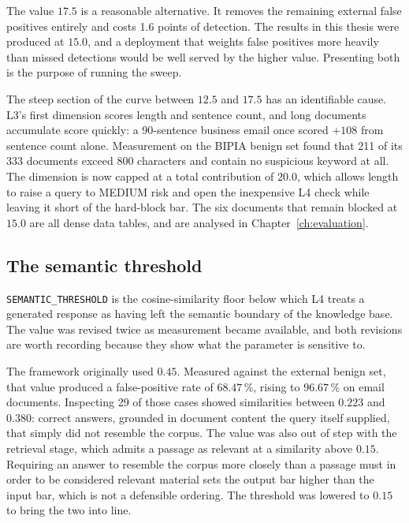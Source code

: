 The value $17.5$ is a reasonable alternative. It removes the remaining external false positives entirely and costs 1.6 points of detection. The results in this thesis were produced at $15.0$, and a deployment that weights false positives more heavily than missed detections would be well served by the higher value. Presenting both is the purpose of running the sweep.

The steep section of the curve between $12.5$ and $17.5$ has an identifiable cause. L3's first dimension scores length and sentence count, and long documents accumulate score quickly: a 90-sentence business email once scored $+108$ from sentence count alone. Measurement on the BIPIA benign set found that 211 of its 333 documents exceed 800 characters and contain no suspicious keyword at all. The dimension is now capped at a total contribution of $20.0$, which allows length to raise a query to MEDIUM risk and open the inexpensive L4 check while leaving it short of the hard-block bar. The six documents that remain blocked at $15.0$ are all dense data tables, and are analysed in Chapter~\ref{ch:evaluation}.

\subsection{The semantic threshold}
\label{subsec:l4_threshold}

\texttt{SEMANTIC\_THRESHOLD} is the cosine-similarity floor below which L4 treats a generated response as having left the semantic boundary of the knowledge base. The value was revised twice as measurement became available, and both revisions are worth recording because they show what the parameter is sensitive to.

The framework originally used $0.45$. Measured against the external benign set, that value produced a false-positive rate of $68.47\,\%$, rising to $96.67\,\%$ on email documents. Inspecting 29 of those cases showed similarities between $0.223$ and $0.380$: correct answers, grounded in document content the query itself supplied, that simply did not resemble the corpus. The value was also out of step with the retrieval stage, which admits a passage as relevant at a similarity above $0.15$. Requiring an answer to resemble the corpus more closely than a passage must in order to be considered relevant material sets the output bar higher than the input bar, which is not a defensible ordering. The threshold was lowered to $0.15$ to bring the two into line.

